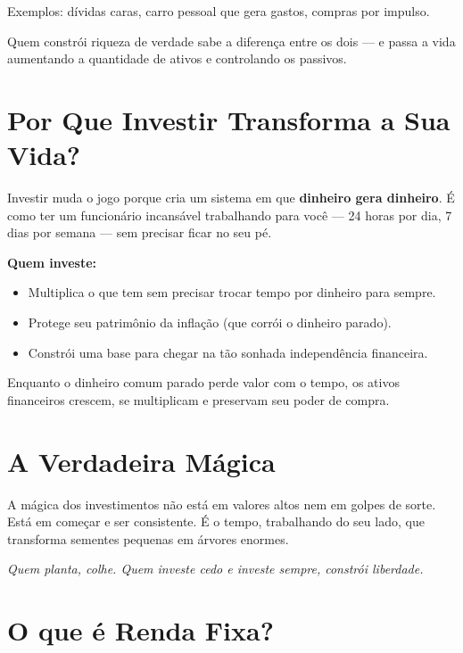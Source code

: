 \noindent Exemplos: dívidas caras, carro pessoal que gera gastos, compras por impulso.

\vspace{0.5cm}
\noindent Quem constrói riqueza de verdade sabe a diferença entre os dois --- e passa a vida aumentando a quantidade de ativos e controlando os passivos.

\section{Por Que Investir Transforma a Sua Vida?}

\noindent Investir muda o jogo porque cria um sistema em que \textbf{dinheiro gera dinheiro}. É como ter um funcionário incansável trabalhando para você --- 24 horas por dia, 7 dias por semana --- sem precisar ficar no seu pé.

\vspace{0.3cm}
\noindent \textbf{Quem investe:}
\begin{itemize}[leftmargin=*]
    \item Multiplica o que tem sem precisar trocar tempo por dinheiro para sempre.
    \item Protege seu patrimônio da inflação (que corrói o dinheiro parado).
    \item Constrói uma base para chegar na tão sonhada independência financeira.
\end{itemize}

\vspace{0.3cm}
\noindent Enquanto o dinheiro comum parado perde valor com o tempo, os ativos financeiros crescem, se multiplicam e preservam seu poder de compra.

\section{A Verdadeira Mágica}

\noindent A mágica dos investimentos não está em valores altos nem em golpes de sorte. Está em começar e ser consistente. É o tempo, trabalhando do seu lado, que transforma sementes pequenas em árvores enormes.

\vspace{0.3cm}
\begin{center}
\textit{Quem planta, colhe. Quem investe cedo e investe sempre, constrói liberdade.}
\end{center}
\section{O que é Renda Fixa?}


